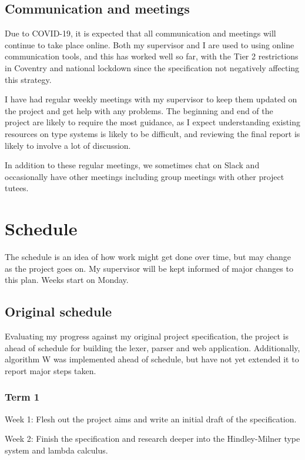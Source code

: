 \documentclass[12pt]{article}
\begin{document}
\subsection{Communication and meetings}

Due to COVID-19, it is expected that all communication and meetings will continue to take place online. Both my supervisor and I are used to using online communication tools, and this has worked well so far, with the Tier 2 restrictions in Coventry and national lockdown since the specification not negatively affecting this strategy.

I have had regular weekly meetings with my supervisor to keep them updated on the project and get help with any problems. The beginning and end of the project are likely to require the most guidance, as I expect understanding existing resources on type systems is likely to be difficult, and reviewing the final report is likely to involve a lot of discussion.

In addition to these regular meetings, we sometimes chat on Slack and occasionally have other meetings including group meetings with other project tutees.

\section{Schedule}

The schedule is an idea of how work might get done over time, but may change as the project goes on. My supervisor will be kept informed of major changes to this plan. Weeks start on Monday.

\subsection{Original schedule}

Evaluating my progress against my original project specification, the project is ahead of schedule for building the lexer, parser and web application. Additionally, algorithm W was implemented ahead of schedule, but have not yet extended it to report major steps taken.

\subsubsection{Term 1}

Week 1: Flesh out the project aims and write an initial draft of the specification.

Week 2: Finish the specification and research deeper into the Hindley-Milner type system and lambda calculus.
\end{document}
